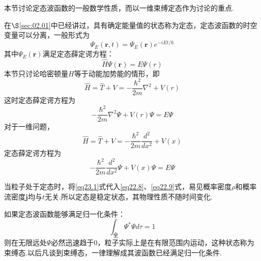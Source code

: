\section[定态]{} \label{sec:02.03} %

本节讨论定态波函数的一般数学性质，而以一维束缚定态作为讨论的重点.

在$\S$\ref{sec:02.01}中已经讲过，具有确定能量值的状态称为定态，定态波函数的时空变量可以分离，一般形式为
\begin{equation}\label{eq23.1}
	\varPsi_{E}(\boldsymbol{r},t)=\varPsi_{E}(\boldsymbol{r})e^{-iEt/\hbar}
\end{equation}
其中$\varPsi_{E}(\boldsymbol{r})$满足定态薛定谔方程：
\begin{equation}\label{eq23.2}
	\hat{H}\varPsi(\boldsymbol{r})=E\varPsi(r)
\end{equation}
本节只讨论哈密顿量$H$等于动能加势能的情形，即
\begin{equation}\label{eq23.3}
	\hat{H}=\hat{T}+V=-\frac{\hbar^{2}}{2m}\nabla^{2}+V(r)
\end{equation}
这时定态薛定谔方程为
\begin{equation}\label{eq23.4}
	-\frac{\hbar^{2}}{2m}\nabla^{2}\varPsi+V(r)\varPsi=E\varPsi
\end{equation}
对于一维问题，
\begin{equation}\label{eq23.5}
	\hat{H}=\hat{T}+V=-\frac{\hbar^{2}}{2m}\frac{d^{2}}{dx^{2}}+V(x)
\end{equation}
定态薛定谔方程为
\begin{equation}\label{eq23.6}
	-\frac{\hbar^{2}}{2m}\frac{d^{2}}{dx^{2}}\varPsi+V(x)\varPsi=E\varPsi
\end{equation}\eqshort

当粒子处于定态时，将\eqref{eq23.1}式代入\eqref{eq22.8}、\eqref{eq22.9}式，易见概率密度$\rho$和概率流密度$\boldsymbol{j}$均与$t$无关.所以定态是稳定状态，其物理性质不随时间变化.

如果定态波函数能够满足归一化条件：
\begin{equation}\label{eq23.7}
	\int_{\text{全}}\varPsi^{*}\varPsi d\tau=1
\end{equation}\eqnormal
则在无限远处$\varPsi$必然迅速趋于0，粒子实际上是在有限范围内运动，这种状态称为束缚态.以后凡谈到束缚态，一律理解成其波函数已经满足归一化条件.

